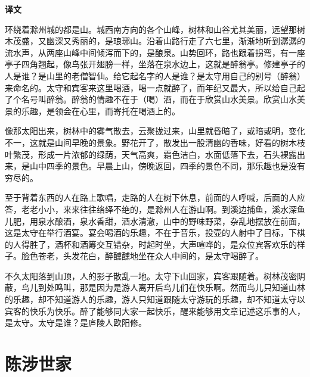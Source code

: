 \documentclass[12pt,UTF-8,openany,a4]{ctexbook}
\begin{document}
\newpage

\begin{Large}
    \noindent\textbf{译文}
\end{Large}


\vspace{1em}

\begin{large}
    \yiwen 
    环绕着滁州城的都是山。城西南方向的各个山峰，树林和山谷尤其美丽，远望那树木茂盛，又幽深又秀丽的，是琅琊山。沿着山路行走了六七里，渐渐地听到潺潺的流水声，从两座山峰中间倾泻而下的，是酿泉。山势回环，路也跟着拐弯，有一座亭子四角翘起，像鸟张开翅膀一样，坐落在泉水边上，这就是醉翁亭。修建亭子的人是谁？是山里的老僧智仙。给它起名字的人是谁？是太守用自己的别号（醉翁）来命名的。太守和宾客来这里喝酒，喝一点就醉了，而年纪又最大，所以给自己起了个名号叫醉翁。醉翁的情趣不在于（喝）酒，而在于欣赏山水美景。欣赏山水美景的乐趣，是领会在心里，而寄托在喝酒上的。
    
    像那太阳出来，树林中的雾气散去，云聚拢过来，山里就昏暗了，或暗或明，变化不一，这就是山间早晚的景象。野花开了，散发出一股清幽的香味，好看的树木枝叶繁茂，形成一片浓郁的绿荫，天气高爽，霜色洁白，水面低落下去，石头裸露出来，是山中四季的景色。早晨上山，傍晚返回，四季的景色不同，那乐趣也是没有穷尽的。
    
    至于背着东西的人在路上歌唱，走路的人在树下休息，前面的人呼喊，后面的人应答，老老小小，来来往往络绎不绝的，是滁州人在游山啊。到溪边捕鱼，溪水深鱼儿肥，用泉水酿酒，泉水香甜，酒水清澈，山中的野味野菜，杂乱地摆放在前面，这是太守在举行酒宴。宴会喝酒的乐趣，不在于音乐，投壶的人射中了目标，下棋的人得胜了，酒杯和酒筹交互错杂，时起时坐，大声喧哗的，是众位宾客欢乐的样子。脸色苍老，头发花白，醉醺醺地坐在众人中间的，是太守喝醉了。
    
    不久太阳落到山顶，人的影子散乱一地。太守下山回家，宾客跟随着。树林茂密阴蔽，鸟儿到处鸣叫，那是因为是游人离开后鸟儿们在快乐啊。然而鸟儿只知道山林的乐趣，却不知道游人的乐趣，游人只知道跟随太守游玩的乐趣，却不知道太守以宾客的快乐为快乐。醉了能够同大家一起快乐，醒来能够用文章记述这乐事的人，是太守。太守是谁？是庐陵人欧阳修。
    
\end{large}



\chapter{陈涉世家}
\end{document}
